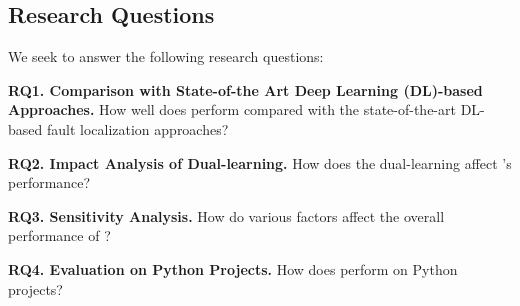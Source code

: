 \subsection{Research Questions}

We seek to answer the following research questions:

\noindent\textbf{RQ1. Comparison with State-of-the Art Deep Learning
  (DL)-based Approaches.}  How well does {\tool} perform compared with
the state-of-the-art DL-based fault localization approaches?

\noindent\textbf{RQ2. Impact Analysis of Dual-learning.} 
How does the dual-learning affect {\tool}'s performance?

\noindent\textbf{RQ3. Sensitivity Analysis.} How do various factors affect the overall performance of {\tool}?


\noindent\textbf{RQ4. Evaluation on Python Projects.} How does {\tool}
perform on Python projects?
